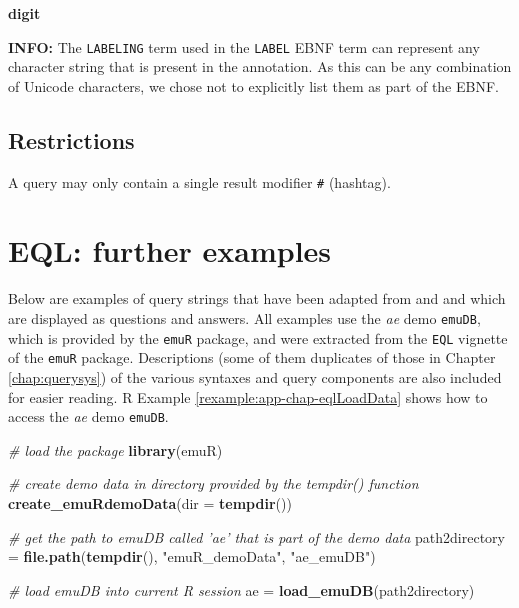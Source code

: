 \documentclass[]{book}
\newenvironment{Shaded}{\begin{snugshade}}{\end{snugshade}}
\newcommand{\CommentTok}[1]{\textcolor[rgb]{0.56,0.35,0.01}{\textit{#1}}}
\newcommand{\DataTypeTok}[1]{\textcolor[rgb]{0.13,0.29,0.53}{#1}}
\newcommand{\KeywordTok}[1]{\textcolor[rgb]{0.13,0.29,0.53}{\textbf{#1}}}
\newcommand{\NormalTok}[1]{#1}
\newcommand{\StringTok}[1]{\textcolor[rgb]{0.31,0.60,0.02}{#1}}
\theoremstyle{definition}
\theoremstyle{definition}
\theoremstyle{definition}
\theoremstyle{remark}
\begin{document}
\textbf{digit}

\textbf{INFO:} The \texttt{LABELING} term used in the \texttt{LABEL}
EBNF term can represent any character string that is present in the
annotation. As this can be any combination of Unicode characters, we
chose not to explicitly list them as part of the EBNF.

\hypertarget{restrictions}{%
\section{Restrictions}\label{restrictions}}

A query may only contain a single result modifier \texttt{\#} (hashtag).

\hypertarget{app-chap:eql}{%
\chapter{EQL: further examples}\label{app-chap:eql}}

Below are examples of query strings that have been adapted from
\citet{cassidy:sc2001a} and \citet{harrington:2002aa} and which are
displayed as questions and answers. All examples use the \emph{ae} demo
\texttt{emuDB}, which is provided by the \texttt{emuR} package, and were
extracted from the \texttt{EQL} vignette of the \texttt{emuR} package.
Descriptions (some of them duplicates of those in Chapter
\ref{chap:querysys}) of the various syntaxes and query components are
also included for easier reading. R Example
\ref{rexample:app-chap-eqlLoadData} shows how to access the \emph{ae}
demo \texttt{emuDB}.

\begin{Shaded}
\begin{Highlighting}[]
\CommentTok{# load the package }
\KeywordTok{library}\NormalTok{(emuR)}

\CommentTok{# create demo data in directory provided by the tempdir() function}
\KeywordTok{create_emuRdemoData}\NormalTok{(}\DataTypeTok{dir =} \KeywordTok{tempdir}\NormalTok{())}

\CommentTok{# get the path to emuDB called 'ae' that is part of the demo data}
\NormalTok{path2directory =}\StringTok{ }\KeywordTok{file.path}\NormalTok{(}\KeywordTok{tempdir}\NormalTok{(), }\StringTok{"emuR_demoData"}\NormalTok{, }\StringTok{"ae_emuDB"}\NormalTok{)}

\CommentTok{# load emuDB into current R session}
\NormalTok{ae =}\StringTok{ }\KeywordTok{load_emuDB}\NormalTok{(path2directory)}
\end{Highlighting}
\end{Shaded}
\end{document}
